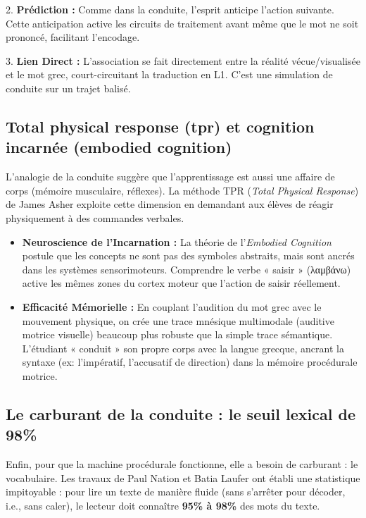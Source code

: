 2. \textbf{Prédiction :} Comme dans la conduite, l'esprit anticipe l'action suivante. Cette
anticipation active les circuits de traitement avant même que le mot ne soit prononcé, facilitant
l'encodage.\cite{III-3-3-ref53}

3. \textbf{Lien Direct :} L'association se fait directement entre la réalité vécue/visualisée et le
mot grec, court-circuitant la traduction en L1. C'est une simulation de conduite sur un trajet
balisé.



\subsection{Total physical response (tpr) et cognition incarnée (embodied cognition)}

L'analogie de la conduite suggère que l'apprentissage est aussi une affaire de corps (mémoire
musculaire, réflexes). La méthode TPR (\textit{Total Physical Response}) de James Asher exploite
cette dimension en demandant aux élèves de réagir physiquement à des commandes
verbales.\cite{III-3-3-ref56}

\begin{itemize}\item \textbf{Neuroscience de l'Incarnation :} La théorie de l'\textit{Embodied Cognition} postule que les concepts ne sont pas des symboles abstraits, mais sont ancrés dans les systèmes sensorimoteurs. Comprendre le verbe « saisir » (λαμβάνω) active les mêmes zones du cortex moteur que l'action de saisir réellement.\cite{III-3-3-ref58}\item \textbf{Efficacité Mémorielle :} En couplant l'audition du mot grec avec le mouvement physique, on crée une trace mnésique multimodale (auditive \+ motrice \+ visuelle) beaucoup plus robuste que la simple trace sémantique. L'étudiant « conduit » son propre corps avec la langue grecque, ancrant la syntaxe (ex: l'impératif, l'accusatif de direction) dans la mémoire procédurale motrice.\cite{III-3-3-ref61}\end{itemize}

\subsection{Le carburant de la conduite : le seuil lexical de 98\%}

Enfin, pour que la machine procédurale fonctionne, elle a besoin de carburant : le vocabulaire. Les
travaux de Paul Nation et Batia Laufer ont établi une statistique impitoyable : pour lire un texte
de manière fluide (sans s'arrêter pour décoder, i.e., sans caler), le lecteur doit connaître
\textbf{95\% à 98\%} des mots du texte.\cite{III-3-3-ref64}

